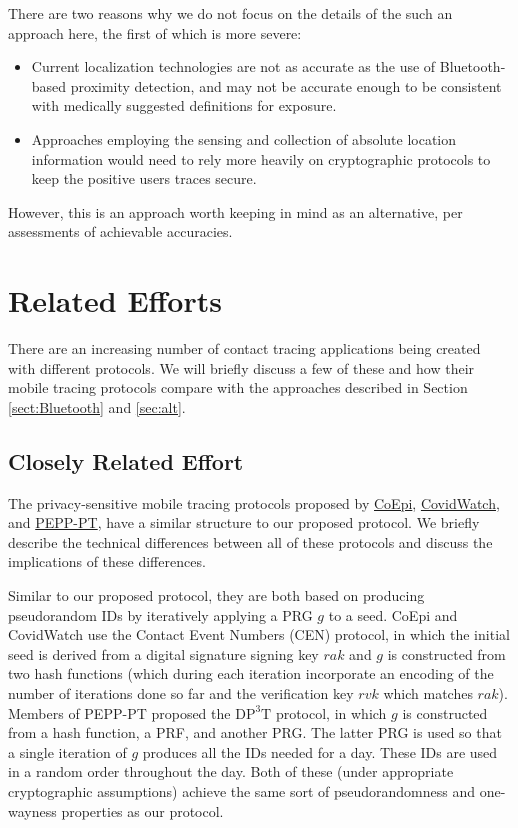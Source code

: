 \documentclass{article}
\begin{document}
There are two reasons why we do not focus on the details of the such an approach here, the first of which is more severe:
\begin{itemize}
    \item Current localization technologies are not as accurate as the use of Bluetooth-based proximity detection, and may not be accurate enough to be consistent with medically suggested definitions for exposure.
    \item Approaches employing the sensing and collection of absolute location information would need to rely more heavily on cryptographic protocols to keep the positive users traces secure.
\end{itemize}
However, this is an approach worth keeping in mind as an alternative, per assessments of achievable accuracies.

\section{Related Efforts}
\label{sec:alternatives}
\label{sec:comparisons}

There are an increasing number of contact tracing applications being created with different protocols.
We will briefly discuss a few of these and how their mobile tracing protocols compare with the approaches described in Section \ref{sect:Bluetooth} and \ref{sec:alt}.

\subsection{Closely Related Effort}
The privacy-sensitive mobile tracing protocols proposed by
\href{https://www.coepi.org/}{CoEpi}\cite{coepi},
\href{https://www.covid-watch.org/}{CovidWatch}\cite{covidwatch},
and \href{https://www.pepp-pt.org/}{PEPP-PT}\cite{pepppt}, 
have a similar structure to our proposed protocol.
We briefly describe the technical differences between all of these protocols and discuss the implications of these differences.

Similar to our proposed protocol, they are both based on producing pseudorandom IDs by iteratively applying a PRG $g$ to a seed.
CoEpi and CovidWatch use the Contact Event Numbers (CEN) protocol, in which the initial seed is derived from a digital signature signing key $rak$ and $g$ is constructed from two hash functions (which during each iteration incorporate an encoding of the number of iterations done so far and the verification key $rvk$ which matches $rak$).
Members of PEPP-PT proposed the $\mathrm{DP^3T}$\cite{dp3t} protocol, in which $g$ is constructed from a hash function, a PRF, and another PRG.
The latter PRG is used so that a single iteration of $g$ produces all the IDs needed for a day.
These IDs are used in a random order throughout the day.
Both of these (under appropriate cryptographic assumptions) achieve the same sort of pseudorandomness and one-wayness properties as our protocol.
\end{document}

